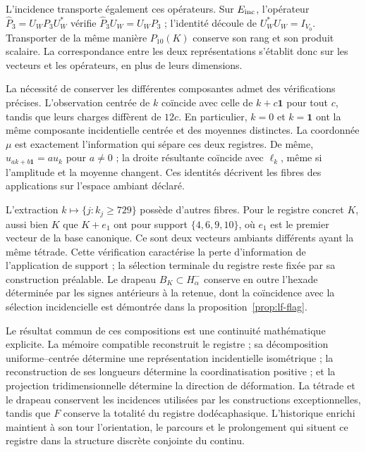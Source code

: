 L’incidence transporte également ces opérateurs. Sur
\(E_{\rm inc}\), l’opérateur
\(\widehat P_3=U_WP_3U_W^*\) vérifie
\(\widehat P_3U_W=U_WP_3\) ; l’identité découle de
\(U_W^*U_W=I_{V_0}\). Transporter de la même manière
\(P_{10}(K)\) conserve son rang et son produit scalaire.
La correspondance entre les deux représentations s’établit
donc sur les vecteurs et les opérateurs, en plus de leurs dimensions.

La nécessité de conserver les différentes composantes admet
des vérifications précises. L’observation centrée de \(k\) coïncide
avec celle de \(k+c\mathbf1\) pour tout \(c\), tandis que leurs
charges diffèrent de \(12c\). En particulier, \(k=0\) et
\(k=\mathbf1\) ont la même composante incidentielle centrée
et des moyennes distinctes. La coordonnée \(\mu\) est exactement
l’information qui sépare ces deux registres. De même,
\(u_{ak+b\mathbf1}=a u_k\) pour \(a\ne0\) ; la droite
résultante coïncide avec \(\ell_k\), même si l’amplitude
et la moyenne changent. Ces identités décrivent les fibres des
applications sur l’espace ambiant déclaré.

L’extraction \(k\mapsto\{j:k_j\geq729\}\) possède d’autres
fibres. Pour le registre concret \(K\), aussi bien \(K\) que
\(K+e_1\) ont pour support \(\{4,6,9,10\}\), où
\(e_1\) est le premier vecteur de la base canonique. Ce sont deux vecteurs
ambiants différents ayant la même tétrade. Cette vérification
caractérise la perte d’information de l’application de support ; la
sélection terminale du registre reste fixée par sa
construction préalable. Le drapeau
\(B_K\subset H^-_\alpha\) conserve en outre l’hexade déterminée
par les signes antérieurs à la retenue, dont la coïncidence avec la
sélection incidencielle est démontrée dans la
proposition~\ref{prop:lf-flag}.

Le résultat commun de ces compositions est une continuité mathématique explicite. La mémoire compatible reconstruit le registre ; sa décomposition uniforme--centrée détermine une représentation incidentielle isométrique ; la reconstruction de ses longueurs détermine la coordinatisation positive ; et la projection tridimensionnelle détermine la direction de déformation. La tétrade et le drapeau conservent les incidences utilisées par les constructions exceptionnelles, tandis que \(F\) conserve la totalité du registre dodécaphasique. L'historique enrichi maintient à son tour l'orientation, le parcours et le prolongement qui situent ce registre dans la structure discrète conjointe du continu.
